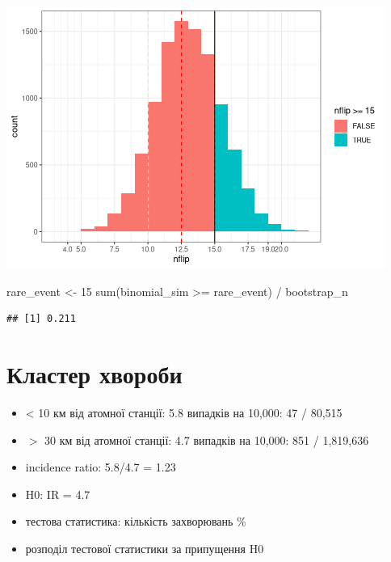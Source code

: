 \documentclass[
  10pt,
]{article}
\newenvironment{Shaded}{\begin{snugshade}}{\end{snugshade}}
\newcommand{\DecValTok}[1]{\textcolor[rgb]{0.00,0.00,0.81}{#1}}
\newcommand{\FunctionTok}[1]{\textcolor[rgb]{0.00,0.00,0.00}{#1}}
\newcommand{\NormalTok}[1]{#1}
\newcommand{\OtherTok}[1]{\textcolor[rgb]{0.56,0.35,0.01}{#1}}
\newcommand{\SpecialCharTok}[1]{\textcolor[rgb]{0.00,0.00,0.00}{#1}}
\begin{document}
\includegraphics{05.pvalues_files/figure-latex/unnamed-chunk-6-1.png}

\begin{Shaded}
\begin{Highlighting}[]
\NormalTok{rare\_event }\OtherTok{\textless{}{-}} \DecValTok{15}
\FunctionTok{sum}\NormalTok{(binomial\_sim }\SpecialCharTok{\textgreater{}=}\NormalTok{ rare\_event) }\SpecialCharTok{/}\NormalTok{ bootstrap\_n}
\end{Highlighting}
\end{Shaded}

\begin{verbatim}
## [1] 0.211
\end{verbatim}

\newpage

\hypertarget{ux43aux43bux430ux441ux442ux435ux440-ux445ux432ux43eux440ux43eux431ux438}{%
\section{Кластер
хвороби}\label{ux43aux43bux430ux441ux442ux435ux440-ux445ux432ux43eux440ux43eux431ux438}}

\begin{itemize}
\item
  \textless{} 10 км від атомної станції: 5.8 випадків на 10,000: 47 /
  80,515
\item
  \(>\) 30 км від атомної станції: 4.7 випадків на 10,000: 851 /
  1,819,636
\item
  incidence ratio: 5.8/4.7 = 1.23
\item
  H0: IR = 4.7
\item
  тестова статистика: кількість захворювань \%
\item
  розподіл тестової статистики за припущення H0
\end{itemize}
\end{document}
